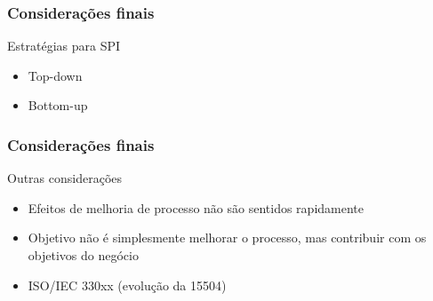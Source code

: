 \begin{frame}[parent={ie:agenda}, hasnext=true, hasprev=false]
	\frametitle{Considerações finais}
	
	\begin{block:fact}{Estratégias para SPI}
		\begin{itemize}
			\item Top-down
			\item Bottom-up
		\end{itemize}
	\end{block:fact}
	
\end{frame}


\begin{frame}[hasnext=true, hasprev=true]
	\frametitle{Considerações finais}
	
	\begin{block:fact}{Outras considerações}
		\begin{itemize}
			\item Efeitos de melhoria de processo não são sentidos rapidamente
			
			\item Objetivo não é simplesmente melhorar o processo, mas contribuir
			com os objetivos do negócio
			
			\item ISO/IEC 330xx (evolução da 15504)
		\end{itemize}
	\end{block:fact}
	
\end{frame}
